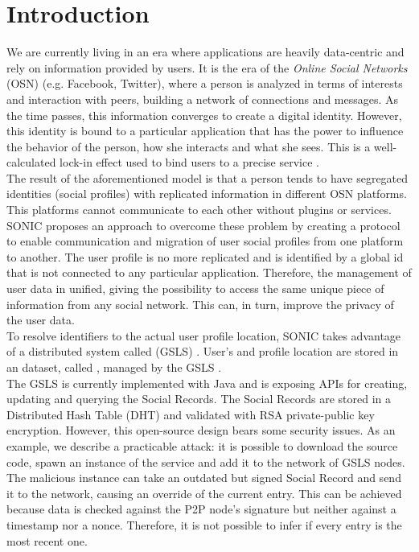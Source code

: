 \section{Introduction}
\label{S:1}

We are currently living in an era where applications are heavily data-centric and rely on information provided by users. It is the era of the \textit{Online Social Networks} (OSN) \cite{gondor_sonic:_2014} (e.g. Facebook, Twitter), where a person is analyzed in terms of interests and interaction with peers, building a network of connections and messages. As the time passes, this information converges to create a digital identity. However, this identity is bound to a particular application that has the power to influence the behavior of the person, how she interacts and what she sees. This is a well-calculated lock-in effect used to bind users to a precise service \cite{gondor_distributed_2016}. 
\\

The result of the aforementioned model is that a person tends to have segregated identities (social profiles) with replicated information in different OSN platforms. This platforms cannot communicate to each other without plugins or services. SONIC proposes an approach to overcome these problem by creating a protocol to enable communication and migration of user social profiles from one platform to another. The user profile is no more replicated and is identified by a global id that is not connected to any particular application. Therefore, the management of user data in unified, giving the possibility to access the same unique piece of information from any social network. This can, in turn, improve the privacy of the user data. 
\\

To resolve identifiers to the actual user profile location, SONIC takes advantage of a distributed system called  (GSLS) \cite{gondor_distributed_2016}. User's  and profile location are stored in an dataset, called , managed by the GSLS \cite{gondor_distributed_2016}.
\\

The GSLS is currently implemented with Java and is exposing APIs for creating, updating and querying the Social Records. The Social Records are stored in a Distributed Hash Table (DHT) and validated with RSA private-public key encryption. However, this open-source design bears some security issues. As an example, we describe a practicable attack: it is possible to download the source code, spawn an instance of the service and add it to the network of GSLS nodes. The malicious instance can take an outdated but signed Social Record and send it to the network, causing an override of the current entry. This can be achieved because data is checked against the P2P node's signature but neither against a timestamp nor a nonce. Therefore, it is not possible to infer if every entry is the most recent one. 
\\

